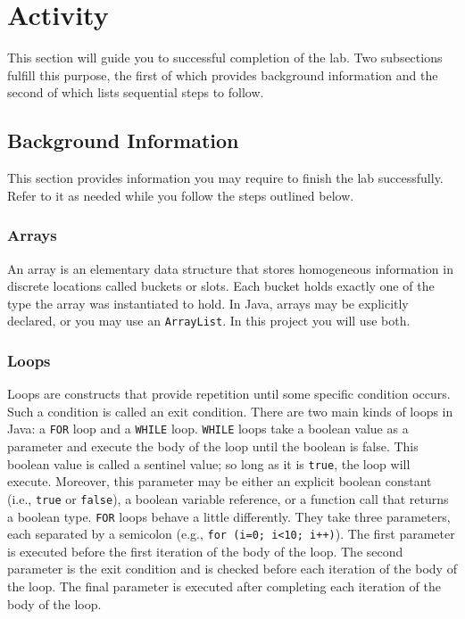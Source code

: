 \section{Activity}
This section will guide you to successful completion of the lab.
Two subsections fulfill this purpose, the first of which provides background information and the second of which lists sequential steps to follow. 

\subsection{Background Information}
This section provides information you may require to finish the lab successfully. 
Refer to it as needed while you follow the steps outlined below.

\subsubsection{Arrays}
An array is an elementary data structure that stores homogeneous information in discrete locations called buckets or slots. 
Each bucket holds exactly one of the type the array was instantiated to hold. 
In Java, arrays may be explicitly declared, or you may use an {\tt ArrayList}. 
In this project you will use both.

\subsubsection{Loops}
Loops are constructs that provide repetition until some specific condition occurs. Such a condition is called an exit condition. There are two main kinds of loops in Java: a {\tt FOR} loop and a {\tt WHILE} loop. {\tt WHILE} loops take a boolean value as a parameter and execute the body of the loop until the boolean is false. This boolean value is called a sentinel value; so long as it is {\tt true}, the loop will execute.  Moreover, this parameter may be either an explicit boolean constant (i.e., {\tt true} or {\tt false}), a boolean variable reference, or a function call that returns a boolean type. {\tt FOR} loops behave a little differently. They take three parameters, each separated by a semicolon (e.g., {\tt for (i=0; i<10; i++)}). The first parameter is executed before the first iteration of the body of the loop. The second parameter is the exit condition and is checked before each iteration of the body of the loop. The final parameter is executed after completing each iteration of the body of the loop.

